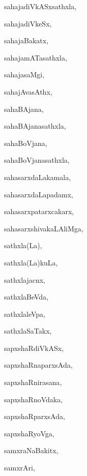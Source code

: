 \begin{multicols}{3}
{\noindent
{sahajadiVkASxsathxla}, \pageref{sahajadiVkASxsathxla}

\noindent
{sahajadiVkeSx}, \pageref{sahajadiVkeSx}

\noindent
{sahajaBakatx}, \pageref{sahajaBakatx}

\noindent
{sahajamATasathxla}, \pageref{sahajamATasathxla}

\noindent
{sahajasaMgi}, \pageref{sahajasaMgi}

\noindent
{sahajAvasAthx}, \pageref{sahajAvasAthx}

\noindent
{sahaBAjana}, \pageref{sahaBAjana}

\noindent
{sahaBAjanasathxla}, \pageref{sahaBAjanasathxla}

\noindent
{sahaBoVjana}, \pageref{sahaBoVjana}

\noindent
{sahaBoVjanasathxla}, \pageref{sahaBoVjanasathxla}

\noindent
{sahasarxdaLakamala}, \pageref{sahasarxdaLakamala}

\noindent
{sahasarxdaLapadamx}, \pageref{sahasarxdaLapadamx}

\noindent
{sahasarxpatarxcakarx}, \pageref{sahasarxpatarxcakarx}

\noindent
{sahasarxshivakaLAliMga}, \pageref{sahasarxshivakaLAliMga}

\noindent
{sathxla(La)}, \pageref{sathxlaLa}

\noindent
{sathxla(La)kuLa}, \pageref{sathxlaLakuLa}

\noindent
{sathxlajacnx}, \pageref{sathxlajacnx}

\noindent
{sathxlaBeVda}, \pageref{sathxlaBeVda}

\noindent
{sathxlaleVpa}, \pageref{sathxlaleVpa}

\noindent
{sathxlaSaTakx}, \pageref{sathxlaSaTakx}

\noindent
{sapxshaRdiVkASx}, \pageref{sapxshaRdiVkASx}

\noindent
{sapxshaRnaparxsAda}, \pageref{sapxshaRnaparxsAda}

\noindent
{sapxshaRnirasana}, \pageref{sapxshaRnirasana}

\noindent
{sapxshaRnoVdaka}, \pageref{sapxshaRnoVdaka}

\noindent
{sapxshaRparxsAda}, \pageref{sapxshaRparxsAda}

\noindent
{sapxshaRyoVga}, \pageref{sapxshaRyoVga}

\noindent
{samxraNaBakitx}, \pageref{samxraNaBakitx}

\noindent
{samxrAri}, \pageref{samxrAri}

}
\end{multicols}
